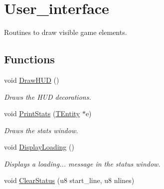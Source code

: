 \hypertarget{group__user__interface}{}\section{User\+\_\+interface}
\label{group__user__interface}


Routines to draw visible game elements.  


\subsection*{Functions}
\begin{DoxyCompactItemize}
\item 
\mbox{\label{group__user__interface_ga9c256069a6dda3ba120c624a6e3f2c34}} 
void \mbox{\hyperlink{group__user__interface_ga9c256069a6dda3ba120c624a6e3f2c34}{Draw\+H\+UD}} ()
\begin{DoxyCompactList}\small\item\em Draws the H\+UD decorations. \end{DoxyCompactList}\item 
\mbox{\label{group__user__interface_ga35b18059a439e2d01de270944eb907ae}} 
void \mbox{\hyperlink{group__user__interface_ga35b18059a439e2d01de270944eb907ae}{Print\+Stats}} (\mbox{\hyperlink{structTEntity}{T\+Entity}} $\ast$e)
\begin{DoxyCompactList}\small\item\em Draws the {\itshape stats} window. \end{DoxyCompactList}\item 
\mbox{\label{group__user__interface_ga3ada17b0be0c8171d1620e7e32464292}} 
void \mbox{\hyperlink{group__user__interface_ga3ada17b0be0c8171d1620e7e32464292}{Display\+Loading}} ()
\begin{DoxyCompactList}\small\item\em Displays a \textquotesingle{}loading...\textquotesingle{} message in the status window. \end{DoxyCompactList}\item 
\mbox{\label{group__user__interface_ga5f1a5dc4199a971852d2bae7f7b69ee0}} 
void \mbox{\hyperlink{group__user__interface_ga5f1a5dc4199a971852d2bae7f7b69ee0}{Clear\+Status}} (u8 start\+\_\+line, u8 nlines)

\end{DoxyCompactItemize}
